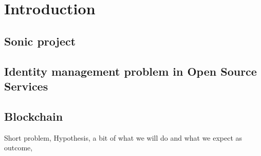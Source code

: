 \section{Introduction}
\label{S:1}

\subsection{Sonic project}

\subsection{Identity management problem in Open Source Services}
\subsection{Blockchain}

Short problem, 
Hypothesis,
a bit of what we will do and what we expect as outcome,